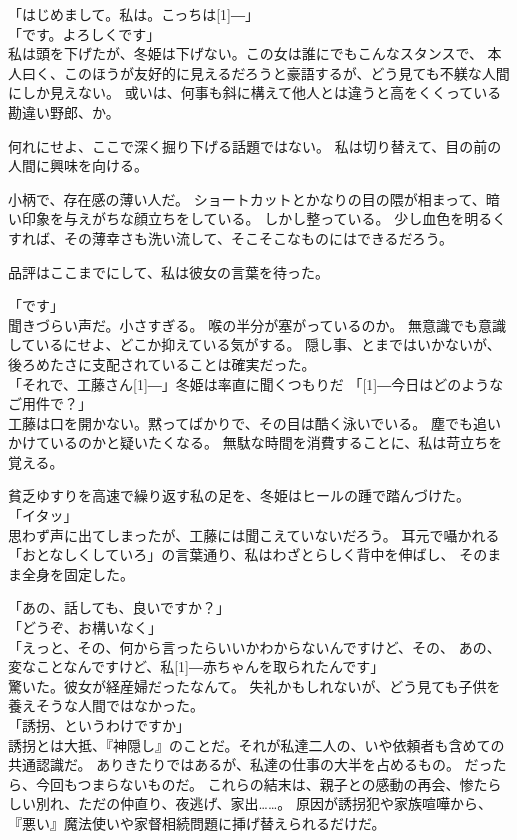 \documentclass[../HiganMain]{subfiles}
\begin{document}
「はじめまして。私は。こっちは\scalebox{3}[1]{―}」\\
「です。よろしくです」\\
私は頭を下げたが、冬姫は下げない。この女は誰にでもこんなスタンスで、
本人曰く、このほうが友好的に見えるだろうと豪語するが、どう見ても不躾な人間にしか見えない。
或いは、何事も斜に構えて他人とは違うと高をくくっている勘違い野郎、か。

何れにせよ、ここで深く掘り下げる話題ではない。
私は切り替えて、目の前の人間に興味を向ける。

小柄で、存在感の薄い人だ。
ショートカットとかなりの目の隈が相まって、暗い印象を与えがちな顔立ちをしている。
しかし整っている。
少し血色を明るくすれば、その薄幸さも洗い流して、そこそこなものにはできるだろう。

品評はここまでにして、私は彼女の言葉を待った。

「です」\\
聞きづらい声だ。小さすぎる。
喉の半分が塞がっているのか。
無意識でも意識しているにせよ、どこか抑えている気がする。
隠し事、とまではいかないが、後ろめたさに支配されていることは確実だった。\\
「それで、工藤さん\scalebox{3}[1]{―}」冬姫は率直に聞くつもりだ
「\scalebox{3}[1]{―}今日はどのようなご用件で？」\\
工藤は口を開かない。黙ってばかりで、その目は酷く泳いでいる。
塵でも追いかけているのかと疑いたくなる。
無駄な時間を消費することに、私は苛立ちを覚える。

貧乏ゆすりを高速で繰り返す私の足を、冬姫はヒールの踵で踏んづけた。\\
「イタッ」\\
思わず声に出てしまったが、工藤には聞こえていないだろう。
耳元で囁かれる「おとなしくしていろ」の言葉通り、私はわざとらしく背中を伸ばし、
そのまま全身を固定した。

「あの、話しても、良いですか？」\\
「どうぞ、お構いなく」\\
「えっと、その、何から言ったらいいかわからないんですけど、その、
あの、変なことなんですけど、私\scalebox{3}[1]{―}赤ちゃんを取られたんです」\\
驚いた。彼女が経産婦だったなんて。
失礼かもしれないが、どう見ても子供を養えそうな人間ではなかった。\\
「誘拐、というわけですか」\\
誘拐とは大抵、『神隠し』のことだ。それが私達二人の、いや依頼者も含めての共通認識だ。
ありきたりではあるが、私達の仕事の大半を占めるもの。
だったら、今回もつまらないものだ。
これらの結末は、親子との感動の再会、惨たらしい別れ、ただの仲直り、夜逃げ、家出……。
原因が誘拐犯や家族喧嘩から、『悪い』魔法使いや家督相続問題に挿げ替えられるだけだ。
\end{document}

